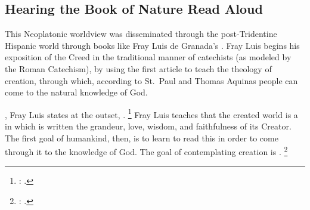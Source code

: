 \subsection{%
Hearing the Book of Nature Read Aloud
}

This Neoplatonic worldview was disseminated through the post-Tridentine Hispanic world through books like Fray Luis de Granada's .
Fray Luis begins his exposition of the Creed in the traditional manner of catechists (as modeled by the Roman Catechism), by using the first article to teach the theology of creation, through which, according to St.~Paul and Thomas Aquinas people can come to the natural knowledge of God.

, Fray Luis states at the outset, .%
	\footnote{%
	\Autocite[182]{LuisdeGranada:Simbolo}: .
	}
Fray Luis teaches that the created world is a  in which is written the grandeur, love, wisdom, and faithfulness of its Creator.
The first goal of humankind, then, is to learn to read this  in order to come through it to the knowledge of God. 
The goal of contemplating creation is .%
	\footnote{%
	\Autocite[184]{LuisdeGranada:Simbolo}: .
	}

